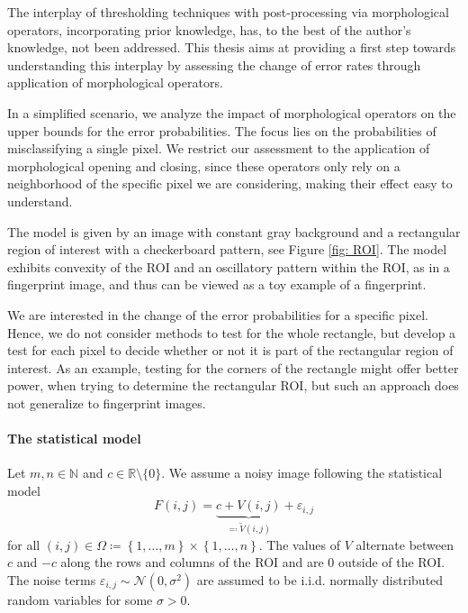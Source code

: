 \documentclass[a4paper,12pt]{article}
\theoremstyle{plain}
\theoremstyle{definition}
\numberwithin{equation}{section}
\begin{document}
The interplay of thresholding techniques with post-processing via morphological operators, incorporating prior knowledge, has, to the best of the author's knowledge, not been addressed. This thesis aims at providing a first step towards understanding this interplay by assessing the change of error rates through application of morphological operators.

In a simplified scenario, we analyze the impact of morphological operators on the upper bounds for the error probabilities. The focus lies on the probabilities of misclassifying a single pixel. We restrict our assessment to the application of morphological opening and closing, since these operators only rely on a neighborhood of the specific pixel we are considering, making their effect easy to understand.

The model is given by an image with constant gray background and a rectangular region of interest with a checkerboard pattern, see Figure \ref{fig: ROI}. The model exhibits convexity of the ROI and an oscillatory pattern within the ROI, as in a fingerprint image, and thus can be viewed as a toy example of a fingerprint.

We are interested in the change of the error probabilities for a specific pixel. Hence, we do not consider methods to test for the whole rectangle, but develop a test for each pixel to decide whether or not it is part of the rectangular region of interest. As an example, testing for the corners of the rectangle might offer better power, when trying to determine the rectangular ROI, but such an approach does not generalize to fingerprint images.



\paragraph{The statistical model}

Let $m, n \in \mathbb{N}$ and $c \in \mathbb{R} \setminus \{ 0 \}$. We assume a noisy image following the statistical model
\begin{equation}\label{statmodel}
	F(i, j) = \underbrace{c + V(i, j)}_{\eqqcolon \tilde{V}(i, j)} + \varepsilon_{i, j}
\end{equation}
for all $(i, j) \in \Omega \coloneqq \left\{ 1, \dots, m \right\} \times \left\{ 1, \dots, n \right\}$. The values of $V$ alternate between $c$ and $-c$ along the rows and columns of the ROI and are $0$ outside of the ROI. The noise terms $\varepsilon_{i, j} \sim \mathcal{N}(0, \sigma^2)$ are assumed to be i.i.d. normally distributed random variables for some $\sigma > 0$.
\end{document}
